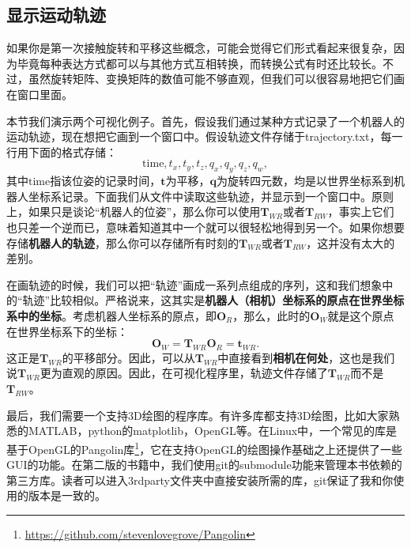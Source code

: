 \subsection{显示运动轨迹}
如果你是第一次接触旋转和平移这些概念，可能会觉得它们形式看起来很复杂，因为毕竟每种表达方式都可以与其他方式互相转换，而转换公式有时还比较长。不过，虽然旋转矩阵、变换矩阵的数值可能不够直观，但我们可以很容易地把它们画在窗口里面。

本节我们演示两个可视化例子。首先，假设我们通过某种方式记录了一个机器人的运动轨迹，现在想把它画到一个窗口中。假设轨迹文件存储于trajectory.txt，每一行用下面的格式存储：$$\mathrm{time}, t_x, t_y, t_z, q_x, q_y, q_z, q_w,$$其中$\mathrm{time}$指该位姿的记录时间，$\bm{t}$为平移，$\bm{q}$为旋转四元数，均是以世界坐标系到机器人坐标系记录。下面我们从文件中读取这些轨迹，并显示到一个窗口中。原则上，如果只是谈论“机器人的位姿”，那么你可以使用$\bm{T}_{WR}$或者$\bm{T}_{RW}$，事实上它们也只差一个逆而已，意味着知道其中一个就可以很轻松地得到另一个。如果你想要存储\textbf{机器人的轨迹}，那么你可以存储所有时刻的$\bm{T}_{WR}$或者$\bm{T}_{RW}$，这并没有太大的差别。

在画轨迹的时候，我们可以把“轨迹”画成一系列点组成的序列，这和我们想象中的“轨迹”比较相似。严格说来，这其实是\textbf{机器人（相机）坐标系的原点在世界坐标系中的坐标}。考虑机器人坐标系的原点，即$\bm{O}_{R}$，那么，此时的$\bm{O}_{W}$就是这个原点在世界坐标系下的坐标：
\begin{equation}
\bm{O}_{W} = \bm{T}_{WR} \bm{O}_R = \bm{t}_{WR}.
\end{equation}
这正是$\bm{T}_{WR}$的平移部分。因此，可以从$\bm{T}_{WR}$中直接看到\textbf{相机在何处}，这也是我们说$\bm{T}_{WR}$更为直观的原因。因此，在可视化程序里，轨迹文件存储了$\bm{T}_{WR}$而不是$\bm{T}_{RW}$。

最后，我们需要一个支持3D绘图的程序库。有许多库都支持3D绘图，比如大家熟悉的MATLAB，python的matplotlib，OpenGL等。在Linux中，一个常见的库是基于OpenGL的Pangolin库\footnote{\url{https://github.com/stevenlovegrove/Pangolin}}，它在支持OpenGL的绘图操作基础之上还提供了一些GUI的功能。在第二版的书籍中，我们使用git的submodule功能来管理本书依赖的第三方库。读者可以进入3rdparty文件夹中直接安装所需的库，git保证了我和你使用的版本是一致的。

